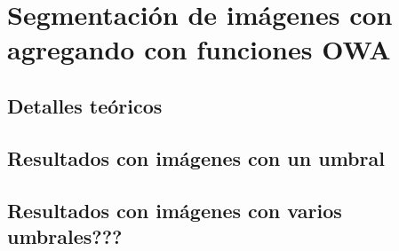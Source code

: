 \chapter{Segmentación de imágenes con agregando con funciones OWA}
\section{Detalles teóricos}
\section{Resultados con imágenes con un umbral}
\section{Resultados con imágenes con varios umbrales???}